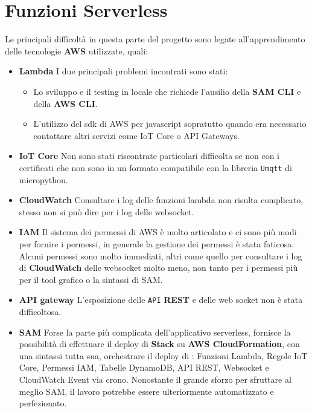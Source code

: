 \section{Funzioni Serverless}
    Le principali difficoltà in questa parte del progetto sono legate all'apprendimento delle tecnologie \textbf{AWS} utilizzate,
    quali:
    \begin{itemize}
        \item \textbf{Lambda} I due principali problemi incontrati sono stati:
         \begin{itemize}
             \item Lo sviluppo e il testing in locale che richiede l'ausilio della \textbf{SAM CLI} e della \textbf{AWS CLI}.
             \item L'utilizzo del sdk di AWS per javascript sopratutto quando era necessario contattare altri servizi come IoT Core o API Gateways.
         \end{itemize}

        \item \textbf{IoT Core} Non sono stati riscontrate particolari difficolta se non con i certificati che non sono in un formato compatibile con la libreria \texttt{Umqtt} di micropython.
        \item \textbf{CloudWatch} Consultare i log delle funzioni lambda non risulta complicato, stesso non si può dire per i log delle websocket.
        \item \textbf{IAM} Il sistema dei permessi di AWS è molto articolato e ci sono più modi per fornire i permessi, in generale la gestione dei permessi è stata faticosa. Alcuni permessi sono molto immediati, altri come quello per consultare i log di \textbf{CloudWatch} delle websocket molto meno, non tanto per i permessi più per il tool grafico o la sintassi di SAM.
        \item \textbf{API gateway} L'esposizione delle \texttt{API} \textbf{REST} e delle web socket non è stata difficoltosa.
        \item \textbf{SAM} Forse la parte più complicata dell'applicativo serverless, fornisce la possibilità di effettuare il deploy di \textbf{Stack} su \textbf{AWS CloudFormation}, con una sintassi tutta sua, orchestrare il deploy di : Funzioni Lambda, Regole IoT Core, Permessi IAM, Tabelle DynamoDB, API REST, Websocket e CloudWatch Event via crono. Nonostante il grande sforzo per sfruttare al meglio SAM, il lavoro potrebbe essere ulteriormente automatizzato e perfezionato. 
    \end{itemize}
    
